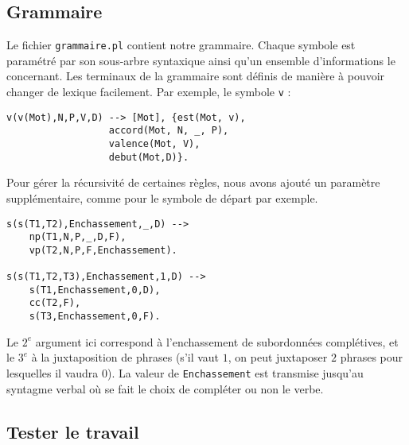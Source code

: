 \documentclass[a4paper,10pt]{article}
\begin{document}
\subsection{Grammaire}
Le fichier \texttt{grammaire.pl} contient notre grammaire. Chaque symbole est paramétré par son sous-arbre syntaxique ainsi qu'un ensemble d'informations le concernant. Les terminaux de la grammaire sont définis de manière à pouvoir changer de lexique facilement. Par exemple, le symbole \texttt{v} :
\begin{verbatim}
v(v(Mot),N,P,V,D) --> [Mot], {est(Mot, v),
			      accord(Mot, N, _, P),
			      valence(Mot, V),
			      debut(Mot,D)}.
\end{verbatim}

Pour gérer la récursivité de certaines règles, nous avons ajouté un paramètre supplémentaire, comme pour le symbole de départ par exemple.
\begin{verbatim}
s(s(T1,T2),Enchassement,_,D) --> 
    np(T1,N,P,_,D,F), 
    vp(T2,N,P,F,Enchassement).

s(s(T1,T2,T3),Enchassement,1,D) --> 
    s(T1,Enchassement,0,D), 
    cc(T2,F), 
    s(T3,Enchassement,0,F).
\end{verbatim}

Le $2^e$ argument ici correspond à l'enchassement de subordonnées complétives, et le $3^e$ à la juxtaposition de phrases (s'il vaut $1$, on peut juxtaposer $2$ phrases pour lesquelles il vaudra $0$). La valeur de \texttt{Enchassement} est transmise jusqu'au syntagme verbal où se fait le choix de compléter ou non le verbe.

\subsection{Tester le travail}
\end{document}
